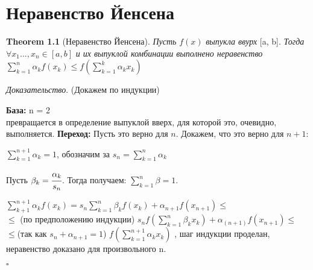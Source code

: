 \section{Неравенство Йенсена}
\noindent\textbf{Theorem 1.1} (Неравенство Йенсена). \textit{Пусть} $ f(x) $ \textit{выпукла ввурх} [a, b]. \textit{Тогда} $\forall x_1 ..., x_n \in [a, b]$ \textit{и их выпуклой комбинации выполнено неравенство} $ \sum^n_{k=1} \alpha_kf(x_k) \leqslant f ( \sum^k_{k=1} \alpha_kx_k)$

\noindent\textit{Доказательство}. (Докажем по индукции)

\noindent\textbf{База:} n = 2\\
 превращается в определение выпуклой вверх, для которой это, очевидно, выполняется.
\textbf{Переход:} Пусть это верно для $n$. Докажем, что это верно для $ n+1 $:

$ \sum^{n+1}_{k=1} \alpha_k = 1$, обозначим за $\textit{s}_n = \sum^n_{k=1}\alpha_k $

Пусть $ \beta_k = \cfrac{\alpha_k}{s_n}$. Тогда получаем: $ \sum^n_{k=1} \beta = 1 $.

\noindent$\sum^{n+1}_{k+1}\alpha_kf(x_k) = s_n\sum^n_{k=1}\beta_kf(x_k)+\alpha_{n+1}f(x_{n+1}) \leqslant$\\
$\leqslant$ (по предположению индукции) $s_n f(\sum^n_{k=1} \beta_kx_k) + \alpha_(n+1)f(x_{n+1}) \leqslant$\\
$\leqslant$(так как $s_n + \alpha_{n+1} = 1$) $ f(\sum^{n+1}_{k=1}\alpha_kx_k) $
, шаг индукции проделан, неравенство доказано для произвольного n.\\
\begin{flushright}$\square$\end{flushright}

\endinput